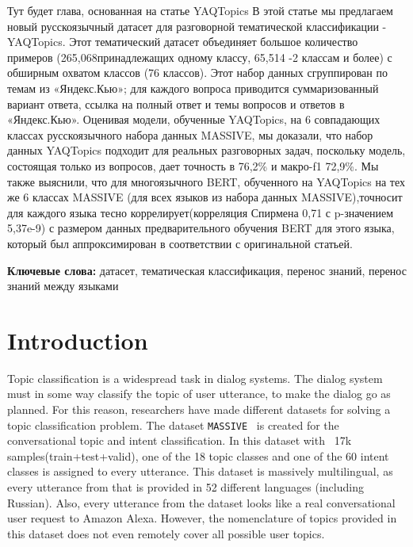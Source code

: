 Тут будет глава, основанная на статье YAQTopics
  В этой статье мы предлагаем новый русскоязычный датасет для разговорной тематической классификации - YAQTopics. Этот тематический датасет объединяет большое количество примеров (265,068принадлежащих одному классу, 65,514 -2 классам и более) с обширным охватом классов (76 классов). Этот набор данных сгруппирован по темам из «Яндекс.Кью»; для каждого вопроса приводится суммаризованный вариант ответа, ссылка на полный ответ и темы вопросов и ответов в «Яндекс.Кью».
Оценивая модели, обученные YAQTopics, на 6 совпадающих классах русскоязычного набора данных  MASSIVE, мы доказали, что набор данных YAQTopics подходит для реальных разговорных задач, поскольку модель, состоящая только из вопросов, дает точность в 76,2\% и макро-f1 72,9\%. Мы также выяснили, что для многоязычного BERT, обученного на YAQTopics 
на тех же 6 классах MASSIVE (для всех языков из набора данных MASSIVE),точносит для каждого языка тесно коррелирует(корреляция Спирмена 0,71 с p-значением 5,37e-9) с размером данных предварительного обучения BERT для этого языка, который был аппроксимирован в соответствии с оригинальной статьей. 
  
\textbf{Ключевые слова:} датасет, тематическая классификация, перенос знаний, перенос знаний между языками


\section{Introduction}
Topic classification is a widespread task in dialog systems\cite{dream1_trudy}. The dialog system must in some way classify the topic of user utterance, to make the dialog go as planned. For this reason, researchers have made different datasets for solving a topic classification problem. 
The dataset \texttt{MASSIVE}~\cite{massive} is created for the conversational topic and intent classification. In this dataset with ~17k samples(train+test+valid), one of the 18 topic classes and one of the 60 intent classes is assigned to every utterance. This dataset is massively multilingual, as every utterance from that is provided in 52 different languages (including Russian). Also, every utterance from the dataset looks like a real conversational user request to Amazon Alexa. However, the nomenclature of topics provided in this dataset does not even remotely cover all possible user topics.

